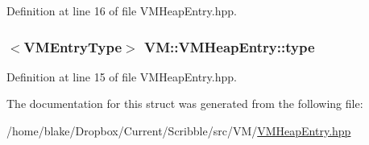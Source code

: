 Definition at line 16 of file V\-M\-Heap\-Entry.\-hpp.

\hypertarget{struct_v_m_1_1_v_m_heap_entry_a8f26d4d459965e613e8d16834fefb0fb}{
\subsubsection[{type}]{$<${\bf V\-M\-Entry\-Type}$>$ V\-M\-::\-V\-M\-Heap\-Entry\-::type}}\label{struct_v_m_1_1_v_m_heap_entry_a8f26d4d459965e613e8d16834fefb0fb}


Definition at line 15 of file V\-M\-Heap\-Entry.\-hpp.



The documentation for this struct was generated from the following file\-:\begin{DoxyCompactItemize}
\item 
/home/blake/\-Dropbox/\-Current/\-Scribble/src/\-V\-M/\hyperlink{_v_m_heap_entry_8hpp}{V\-M\-Heap\-Entry.\-hpp}\end{DoxyCompactItemize}
